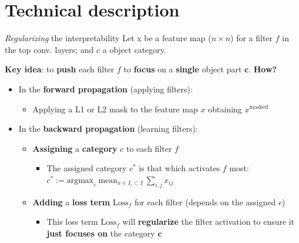 \documentclass{beamer}
\begin{document}
\section{Technical description}

\begin{frame}{\textit{Regularizing} the interpretability}
    Let x be a feature map %
    ($n\times n$) for a filter $f$ in the top conv. layers; and $c$ a object category.\vspace{2mm}
    
	\textbf{Key idea}: to \textbf{push} each filter $f$ to \textbf{focus} on a \textbf{single} object part $\textbf{c}$. %
    \textbf{How?}
	\begin{itemize}[<+->]
        \item In the \textbf{forward propagation} (applying filters):
        \begin{itemize}[<+->]
            \item Applying a L1 or L2 mask to the feature map $x$ obtaining $x^{\mathrm{masked}}$ 
        \end{itemize}
        \item In the \textbf{backward propagation} (learning filters):
        \begin{itemize}[<+->]
            \item \textbf{Assigning} a \textbf{category} $c$ to each filter $f$
            \begin{itemize}
                \item The assigned category $c^{*}$ is that which activates $f$ most: $c^{*}:=\mathrm{argmax}_c\ \mathrm{mean}_{x\in I_c \subset I }\ \sum_{i, j}x_{ij}$
            \end{itemize}
            \item \textbf{Adding} a \textbf{loss term} $\mathbf{\mathrm{Loss}}_f$ for each filter (depends on the assigned $c$)
            \begin{itemize}
                \item This loss term $\mathbf{\mathrm{Loss}}_f$ will \textbf{regularize} the filter activation to ensure it \textbf{just focuses on} the category $\textbf{c}$
            \end{itemize}
        \end{itemize}
    \end{itemize}
    
\end{frame}
\end{document}
